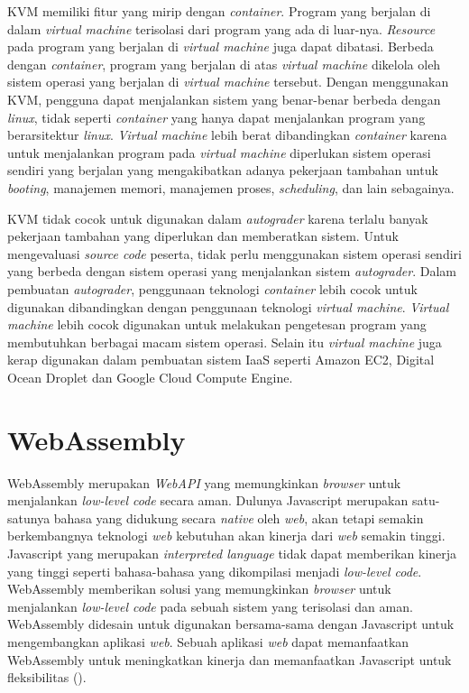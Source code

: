 \par KVM memiliki fitur yang mirip dengan \textit{container}. Program yang berjalan di dalam \textit{virtual machine} terisolasi dari program yang ada di luar-nya. \textit{Resource} pada program yang berjalan di \textit{virtual machine} juga dapat dibatasi. Berbeda dengan \textit{container}, program yang berjalan di atas \textit{virtual machine} dikelola oleh sistem operasi yang berjalan di \textit{virtual machine} tersebut. Dengan menggunakan KVM, pengguna dapat menjalankan sistem yang benar-benar berbeda dengan \textit{linux}, tidak seperti \textit{container} yang hanya dapat menjalankan program yang berarsitektur \textit{linux}. \textit{Virtual machine} lebih berat dibandingkan \textit{container} karena untuk menjalankan program pada \textit{virtual machine} diperlukan sistem operasi sendiri yang berjalan yang mengakibatkan adanya pekerjaan tambahan untuk \textit{booting}, manajemen memori, manajemen proses, \textit{scheduling}, dan lain sebagainya.

\par KVM tidak cocok untuk digunakan dalam \textit{autograder} karena terlalu banyak pekerjaan tambahan yang diperlukan dan memberatkan sistem. Untuk mengevaluasi \textit{source code} peserta, tidak perlu menggunakan sistem operasi sendiri yang berbeda dengan sistem operasi yang menjalankan sistem \textit{autograder}. Dalam pembuatan \textit{autograder}, penggunaan teknologi \textit{container} lebih cocok untuk digunakan dibandingkan dengan penggunaan teknologi \textit{virtual machine}. \textit{Virtual machine} lebih cocok digunakan untuk melakukan pengetesan program yang membutuhkan berbagai macam sistem operasi. Selain itu \textit{virtual machine} juga kerap digunakan dalam pembuatan sistem IaaS seperti Amazon EC2, Digital Ocean Droplet dan Google Cloud Compute Engine.

\section{WebAssembly}

\par WebAssembly merupakan \textit{WebAPI} yang memungkinkan \textit{browser} untuk menjalankan \textit{low-level code} secara aman. Dulunya Javascript merupakan satu-satunya bahasa yang didukung secara \textit{native} oleh \textit{web}, akan tetapi semakin berkembangnya teknologi \textit{web} kebutuhan akan kinerja dari \textit{web} semakin tinggi. Javascript yang merupakan \textit{interpreted language} tidak dapat memberikan kinerja yang tinggi seperti bahasa-bahasa yang dikompilasi menjadi \textit{low-level code}. WebAssembly memberikan solusi yang memungkinkan \textit{browser} untuk menjalankan \textit{low-level code} pada sebuah sistem yang terisolasi dan aman. WebAssembly didesain untuk digunakan bersama-sama dengan Javascript untuk mengembangkan aplikasi \textit{web}. Sebuah aplikasi \textit{web} dapat memanfaatkan WebAssembly untuk meningkatkan kinerja dan memanfaatkan Javascript untuk fleksibilitas (\cite{mdnwebasm}).

